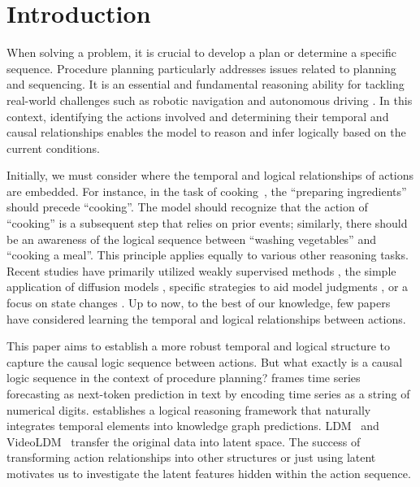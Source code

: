 \section{Introduction}
When solving a problem, it is crucial to develop a plan or determine a specific sequence. Procedure planning particularly addresses issues related to planning and sequencing. It is an essential and fundamental reasoning ability for tackling real-world challenges such as robotic navigation \citep{sermanet2024robovqa,bhaskara2024trajectory} and autonomous driving \citep{wang2024driving,liao2024bat}. In this context, identifying the actions involved and determining their temporal and causal relationships enables the model to reason and infer logically based on the current conditions.

Initially, we must consider where the temporal and logical relationships of actions are embedded. For instance, in the task of cooking~\citep{bollini2013interpreting}, the ``preparing ingredients'' should precede ``cooking''. The model should recognize that the action of ``cooking'' is a subsequent step that relies on prior events; similarly, there should be an awareness of the logical sequence between ``washing vegetables'' and ``cooking a meal''. This principle applies equally to various other reasoning tasks. Recent studies have primarily utilized weakly supervised methods \citep{zhao2022p3iv}, the simple application of diffusion models \citep{wang2023pdpp}, specific strategies to aid model judgments \citep{nagasinghe2024not,wang2023event}, or a focus on state changes \citep{niu2024schema}. Up to now, to the best of our knowledge, few papers have considered learning the temporal and logical relationships between actions.

This paper aims to establish a more robust temporal and logical structure to capture the causal logic sequence between actions. But what exactly is a causal logic sequence in the context of procedure planning? \citet{gruver2024large} frames time series forecasting as next-token prediction in text by encoding time series as a string of numerical digits. \citet{xiong2024teilp} establishes a logical reasoning framework that naturally integrates temporal elements into knowledge graph predictions. 
LDM~\citep{rombach2022high} and VideoLDM~\citep{blattmann2023align} transfer the original data into latent space. The success of transforming action relationships into other structures or just using latent motivates us to investigate the latent features hidden within the action sequence.

